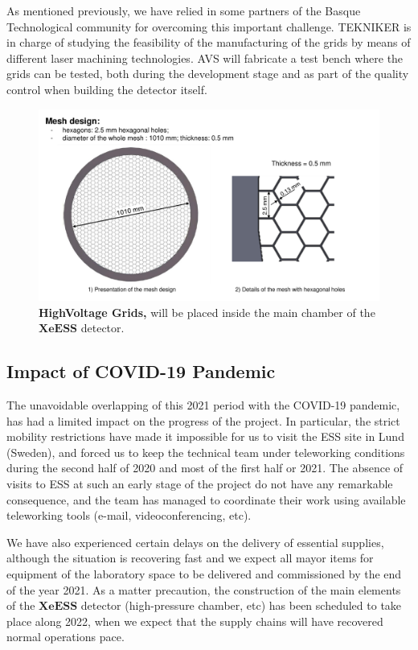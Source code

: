 \documentclass[12pt,a4paper,article]{report} %
\begin{document}
As mentioned previously, we have relied in some partners of the Basque Technological community for overcoming this important challenge. TEKNIKER is in charge of studying the feasibility of the manufacturing of the grids by means of different laser machining technologies. AVS will fabricate a test bench where the grids can be tested, both during the development stage and as part of the quality control when building the detector itself. 

\begin{figure}[ht]
\begin{center}
\includegraphics[width=14cm]{Grids}
\caption{\textbf{HighVoltage Grids,} will be placed inside the main chamber of the $\mathbf{XeESS}$ detector.}
\label{grids}
\end{center}
\end{figure}

\subsection*{Impact of COVID-19 Pandemic}

The unavoidable overlapping of this 2021 period  with the COVID-19 pandemic, has had a limited impact on the progress of the project. In particular, the strict mobility restrictions have made it impossible for us to visit the ESS site in Lund (Sweden), and forced us to keep the technical team under teleworking conditions during the second half of 2020 and most of the first half or 2021. The absence of visits to ESS at such an early stage of the project do not have any remarkable consequence, and the team has managed to coordinate their work using available teleworking tools (e-mail, videoconferencing, etc).

We have also experienced certain delays on the delivery of essential supplies, although the situation is recovering fast and we expect all mayor items for equipment of the laboratory space to be delivered and commissioned  by the end of the year 2021. As a matter precaution, the construction of the main elements of the $\mathbf{XeESS}$ detector (high-pressure chamber, etc) has been scheduled to take place along 2022, when we expect that the supply chains will have recovered normal operations pace. 
\end{document}
